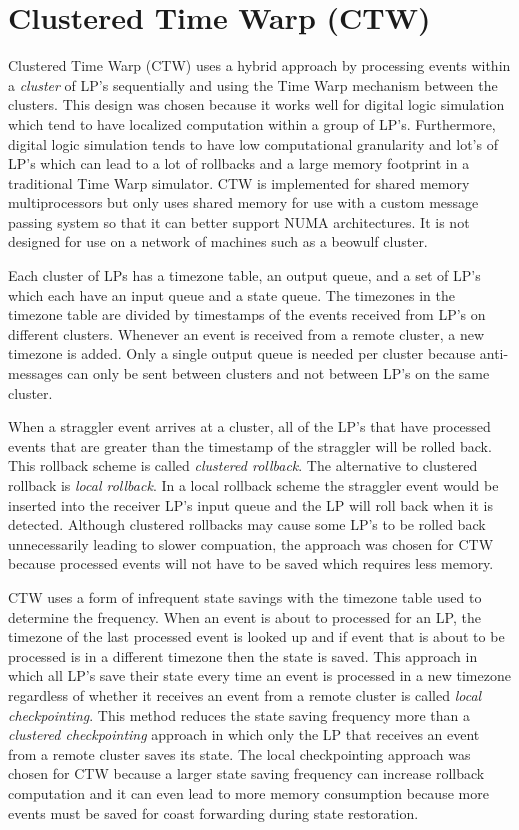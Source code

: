 \documentclass[11pt]{book}
\begin{document}
\section{Clustered Time Warp (CTW)}

Clustered Time Warp\cite{avril-95} (CTW) uses a hybrid approach by processing events within
a \emph{cluster} of LP's sequentially and using the Time Warp mechanism between the clusters.
This design was chosen because it works well for digital logic simulation which tend to have
localized computation within a group of LP's. Furthermore, digital logic simulation tends to
have low computational granularity and lot's of LP's which can lead to a lot of rollbacks
and a large memory footprint in a traditional Time Warp simulator. CTW is implemented for
shared memory multiprocessors but only uses shared memory for use with a custom message passing
system so that it can better support NUMA architectures. It is not designed for use on a
network of machines such as a beowulf cluster.

Each cluster of LPs has a timezone table, an output queue, and a set of LP's which each have an
input queue and a state queue. The timezones in the timezone table are divided by timestamps
of the events received from LP's on different clusters. Whenever an event is received from
a remote cluster, a new timezone is added. Only a single output queue is needed per cluster
because anti-messages can only be sent between clusters and not between LP's on the same
cluster.

When a straggler event arrives at a cluster, all of the LP's that have processed events that
are greater than the timestamp of the straggler will be rolled back. This rollback scheme is
called \emph{clustered rollback}. The alternative to clustered rollback is \emph{local
rollback}. In a local rollback scheme the straggler event would be inserted into the receiver
LP's input queue and the LP will roll back when it is detected. Although clustered rollbacks
may cause some LP's to be rolled back unnecessarily leading to slower compuation, the
approach was chosen for CTW because processed events will not have to be saved which
requires less memory.

CTW uses a form of infrequent state savings with the timezone table used to determine the
frequency. When an event is about to processed for an LP, the timezone of the last processed
event is looked up and if event that is about to be processed is in a different timezone then
the state is saved. This approach in which all LP's save their state every time an event is
processed in a new timezone regardless of whether it receives an event from a remote cluster
is called \emph{local checkpointing}. This method reduces the state saving frequency more
than a \emph{clustered checkpointing} approach in which only the LP that receives an event
from a remote cluster saves its state. The local checkpointing approach was chosen for CTW
because a larger state saving frequency can increase rollback computation and it can even
lead to more memory consumption because more events must be saved for coast forwarding
during state restoration.
\end{document}
